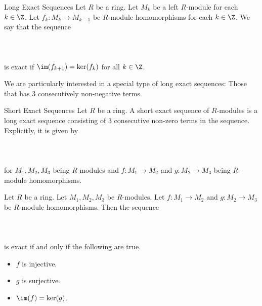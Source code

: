 \documentclass[a4paper]{article}
\begin{document}
\begin{defn}{Long Exact Sequences}{} Let $R$ be a ring. Let $M_k$ be a left $R$-module for each $k\in\Z$. Let $f_k:M_k\to M_{k-1}$ be $R$-module homomorphisms for each $k\in\Z$. We say that the sequence \\~\\
\\~\\
is exact if $\im(f_{k+1})=\ker(f_k)$ for all $k\in\Z$. 
\end{defn}

We are particularly interested in a special type of long exact sequences: Those that has $3$ consecutively non-negative terms. 

\begin{defn}{Short Exact Sequences}{} Let $R$ be a ring. A short exact sequence of $R$-modules is a long exact sequence consisting of $3$ consecutive non-zero terms in the sequence. Explicitly, it is given by \\~\\
\\~\\
for $M_1,M_2,M_3$ being $R$-modules and $f:M_1\to M_2$ and $g:M_2\to M_3$ being $R$-module homomorphisms. 
\end{defn}

\begin{lmm}{}{} Let $R$ be a ring. Let $M_1,M_2,M_3$ be $R$-modules. Let $f:M_1\to M_2$ and $g:M_2\to M_3$ be $R$-module homomorphisms. Then the sequence \\~\\
\\~\\
is exact if and only if the following are true. 
\begin{itemize}
\item $f$ is injective. 
\item $g$ is surjective. 
\item $\im(f)=\ker(g)$. 
\end{itemize}
\end{lmm}
\end{document}
